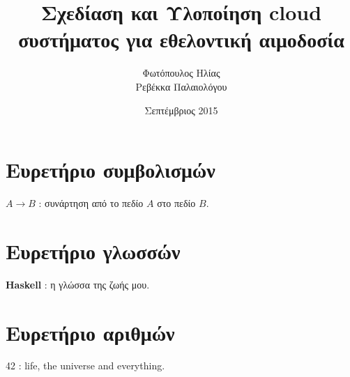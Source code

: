 \documentclass[diploma]{Styles/softlab-thesis}
\begin{document}

\frontmatter

\title{Σχεδίαση και Υλοποίηση cloud συστήματος για εθελοντική αιμοδοσία}
\author{Φωτόπουλος Ηλίας\\Ρεβέκκα Παλαιολόγου}
\date{Σεπτέμβριος 2015}




\maketitle






\tableofcontents
\listoftables
\listoffigures



\mainmatter













% 





\backmatter

\appendix

\chapter{Ευρετήριο συμβολισμών}

$A \rightarrow B$ : συνάρτηση από το πεδίο $A$ στο πεδίο $B$.

\chapter{Ευρετήριο γλωσσών}

\textbf{Haskell} : η γλώσσα της ζωής μου.

\chapter{Ευρετήριο αριθμών}

42 : life, the universe and everything.


\end{document}
